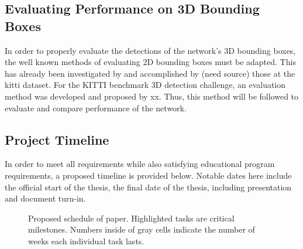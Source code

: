 \subsection{Evaluating Performance on 3D Bounding Boxes}
In order to properly evaluate the detections of the network's 3D bounding boxes, the well known methods of evaluating 2D bounding boxes must be adapted. This has already been investigated by and accomplished by (need source) those at the kitti dataset. For the KITTI benchmark 3D detection challenge, an evaluation method was developed and proposed by xx. Thus, this method will be followed to evaluate and compare performance of the network. 

\subsection{Project Timeline}
In order to meet all requirements while also satisfying educational program requirements, a proposed timeline is provided below. Notable dates here include the official start of the thesis, the final date of the thesis, including presentation and document turn-in.

\begin{figure}[h] %
    \caption{Proposed schedule of paper. Highlighted tasks are critical milestones. Numbers inside of gray cells indicate the number of weeks each individual task lasts.}
\end{figure}












